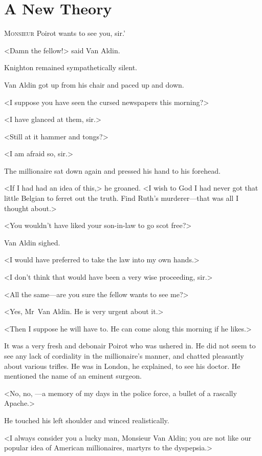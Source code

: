 \chapter{A New Theory}



\lettrine[ante=`]{M}{onsieur}  Poirot wants to see you, sir.'

\zz
<Damn the fellow!> said Van Aldin.

\zz
Knighton remained sympathetically silent.

\zz
Van Aldin got up from his chair and paced up and down.

<I suppose you have seen the cursed newspapers this morning?>

<I have glanced at them, sir.>

<Still at it hammer and tongs?>

<I am afraid so, sir.>

The millionaire sat down again and pressed his hand to his forehead.

<If I had had an idea of this,> he groaned. <I wish to God I had never got that little Belgian to ferret out the truth. Find Ruth's murderer—that was all I thought about.>

<You wouldn't have liked your son-in-law to go scot free?>

Van Aldin sighed.

<I would have preferred to take the law into my own hands.>

<I don't think that would have been a very wise proceeding, sir.>

<All the same—are you sure the fellow wants to see me?>

<Yes, Mr~Van Aldin. He is very urgent about it.>

<Then I suppose he will have to. He can come along this morning if he likes.>

It was a very fresh and debonair Poirot who was ushered in. He did not seem to see any lack of cordiality in the millionaire's manner, and chatted pleasantly about various trifles. He was in London, he explained, to see his doctor. He mentioned the name of an eminent surgeon.

<No, no, —a memory of my days in the police force, a bullet of a rascally Apache.>

He touched his left shoulder and winced realistically.

<I always consider you a lucky man, Monsieur Van Aldin; you are not like our popular idea of American millionaires, martyrs to the dyspepsia.>

